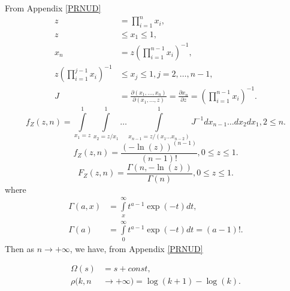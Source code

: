 \documentclass[titlepage,fleqn]{article}%
\begin{document}
From Appendix
\ref{PRNUD}%
\begin{align*}
z  &  =%
{\displaystyle\prod\limits_{i=1}^{n}}
x_{i},\\
z  &  \leq x_{1}\leq1,\\
x_{n}  &  =z\left(
{\displaystyle\prod\limits_{i=1}^{n-1}}
x_{i}\right)  ^{-1},\\
z\left(
{\displaystyle\prod\limits_{i=1}^{j-1}}
x_{i}\right)  ^{-1}  &  \leq x_{j}\leq1,j=2,\ldots,n-1,\\
J  &  =\frac{\partial(x_{1},\ldots,x_{n})}{\partial(x_{1},\ldots,z)}%
=\frac{\partial x_{n}}{\partial z}=\left(
{\displaystyle\prod\limits_{i=1}^{n-1}}
x_{i}\right)  ^{-1}.
\end{align*}%
\[
f_{Z}(z,n)=%
{\displaystyle\int\limits_{x_{1}=z}^{1}}
{\displaystyle\int\limits_{x_{2}=z/x_{1}}^{1}}
\ldots%
{\displaystyle\int\limits_{x_{n-1}=z/\left(  x_{1}\ldots x_{n-2}\right)  }%
^{1}}
J^{-1}dx_{n-1}\ldots dx_{2}dx_{1},2\leq n.
\]%
\[
f_{Z}(z,n)=\frac{(-\ln(z))^{(n-1)}}{(n-1)!},0\leq z\leq1.
\]%
\[
F_{Z}(z,n)=\frac{\Gamma(n,-\ln(z))}{\Gamma(n)},0\leq z\leq1.
\]
where%
\begin{align*}
\Gamma(a,x)  &  =%
{\displaystyle\int\limits_{x}^{\infty}}
t^{a-1}\exp(-t)dt,\\
\Gamma(a)  &  =%
{\displaystyle\int\limits_{0}^{\infty}}
t^{a-1}\exp(-t)dt=(a-1)!.
\end{align*}
Then as $n\rightarrow+\infty$, we have, from Appendix
\ref{PRNUD}%
%

\begin{align*}
\Omega\left(  s\right)   &  =s+const,\\
\rho(k,n  &  \rightarrow+\infty)=\log(k+1)-\log(k).
\end{align*}
\end{document}
